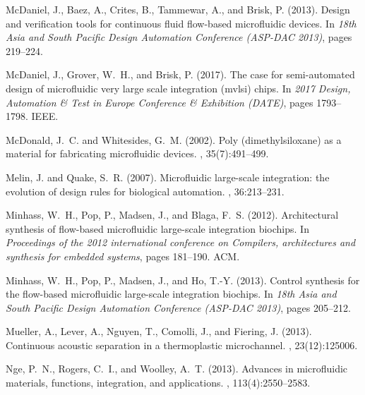 \documentclass[12pt,letterpaper]{report}          %
\begin{document}
\begin{thebibliography}{}
McDaniel, J., Baez, A., Crites, B., Tammewar, A., and Brisk, P. (2013).
\newblock Design and verification tools for continuous fluid flow-based
  microfluidic devices.
\newblock In {\em 18th Asia and South Pacific Design Automation Conference
  (ASP-DAC 2013)}, pages 219--224.

McDaniel, J., Grover, W.~H., and Brisk, P. (2017).
\newblock The case for semi-automated design of microfluidic very large scale
  integration (mvlsi) chips.
\newblock In {\em 2017 Design, Automation \& Test in Europe Conference \&
  Exhibition (DATE)}, pages 1793--1798. IEEE.

McDonald, J.~C. and Whitesides, G.~M. (2002).
\newblock Poly (dimethylsiloxane) as a material for fabricating microfluidic
  devices.
, 35(7):491--499.

Melin, J. and Quake, S.~R. (2007).
\newblock Microfluidic large-scale integration: the evolution of design rules
  for biological automation.
, 36:213--231.


Minhass, W.~H., Pop, P., Madsen, J., and Blaga, F.~S. (2012).
\newblock Architectural synthesis of flow-based microfluidic large-scale
  integration biochips.
\newblock In {\em Proceedings of the 2012 international conference on
  Compilers, architectures and synthesis for embedded systems}, pages 181--190.
  ACM.

Minhass, W.~H., Pop, P., Madsen, J., and Ho, T.-Y. (2013).
\newblock Control synthesis for the flow-based microfluidic large-scale
  integration biochips.
\newblock In {\em 18th Asia and South Pacific Design Automation Conference
  (ASP-DAC 2013)}, pages 205--212.

Mueller, A., Lever, A., Nguyen, T., Comolli, J., and Fiering, J. (2013).
\newblock Continuous acoustic separation in a thermoplastic microchannel.
, 23(12):125006.

Nge, P.~N., Rogers, C.~I., and Woolley, A.~T. (2013).
\newblock Advances in microfluidic materials, functions, integration, and
  applications.
, 113(4):2550--2583.


\end{thebibliography}
\end{document}
